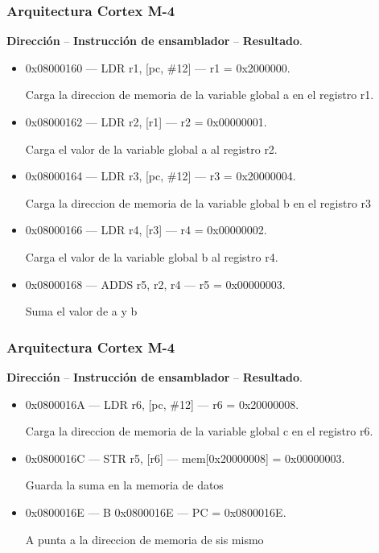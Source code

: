 \documentclass[10.5pt,scale=1.0,t,aspectratio=169,hyperref={pdfpagelabels=false}]{beamer}
\begin{document}
\begin{frame}
	\frametitle{Arquitectura Cortex M-4}
	\textbf{Dirección} -- \textbf{Instrucción de ensamblador} -- \textbf{Resultado}.
	\begin{itemize}
		\item 0x08000160 --- LDR r1, [pc, \#12] --- r1 = 0x2000000.
		
		{\small Carga la direccion de memoria de la variable global a en el registro r1.}
		
		\item 0x08000162 --- LDR r2, [r1] --- r2 = 0x00000001.
		
		{\small Carga el valor de la variable global a al registro r2.}
		
		\item 0x08000164 --- LDR r3, [pc, \#12] --- r3 = 0x20000004.
		
		{\small Carga la direccion de memoria de la variable global b en el registro r3}
		
		\item 0x08000166 --- LDR r4, [r3] --- r4 = 0x00000002.
		
		{\small Carga el valor de la variable global b al registro r4.}
		
		\item 0x08000168 --- ADDS r5, r2, r4 --- r5 = 0x00000003.
		
		{\small Suma el valor de a y b}
	\end{itemize}
\end{frame}
\begin{frame}
	\frametitle{Arquitectura Cortex M-4}
	\textbf{Dirección} -- \textbf{Instrucción de ensamblador} -- \textbf{Resultado}.
	\begin{itemize}
		\item 0x0800016A --- LDR r6, [pc, \#12] --- r6 = 0x20000008.
		
		{\small Carga la direccion de memoria de la variable global c en el registro r6.}
		
		\item 0x0800016C --- STR r5, [r6] --- mem[0x20000008] = 0x00000003.
		
		{\small Guarda la suma en la memoria de datos}
	
		\item 0x0800016E --- B 0x0800016E --- PC = 0x0800016E.
		
		{\small A punta a la direccion de memoria de sis mismo}
	\end{itemize}
\end{frame}
\end{document}
